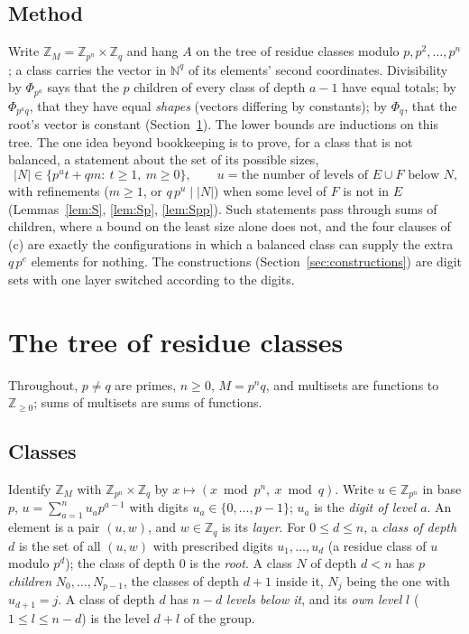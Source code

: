 \documentclass[11pt,a4paper]{amsart}
\theoremstyle{definition}
\theoremstyle{remark}
\newcommand{\Z}{\mathbb{Z}}
\newcommand{\N}{\mathbb{N}}
\begin{document}
\subsection{Method} Write $\Z_M=\Z_{p^n}\times\Z_q$ and hang $A$ on the tree of residue classes modulo
$p,p^2,\dots,p^n$; a class carries the vector in $\N^q$ of its elements' second coordinates. Divisibility by
$\Phi_{p^a}$ says that the $p$ children of every class of depth $a-1$ have equal totals; by $\Phi_{p^aq}$,
that they have equal \emph{shapes} (vectors differing by constants); by $\Phi_q$, that the root's vector is
constant (Section~\ref{sec:tree}). The lower bounds are inductions on this tree. The one idea beyond
bookkeeping is to prove, for a class that is not balanced, a statement about the set of its possible sizes,
\[ |N|\in\{p^ut+qm:\ t\ge 1,\ m\ge 0\},\qquad u=\text{the number of levels of $E\cup F$ below $N$,}\]
with refinements ($m\ge 1$, or $q\,p^u\mid |N|$) when some level of $F$ is not in $E$
(Lemmas~\ref{lem:S}, \ref{lem:Sp}, \ref{lem:Spp}). Such statements pass through sums of children, where a
bound on the least size alone does not, and the four clauses of (c) are exactly the configurations in which a
balanced class can supply the extra $q\,p^e$ elements for nothing. The constructions
(Section~\ref{sec:constructions}) are digit sets with one layer switched according to the digits.

\section{The tree of residue classes}\label{sec:tree}

Throughout, $p\ne q$ are primes, $n\ge 0$, $M=p^nq$, and multisets are functions to $\Z_{\ge 0}$; sums of
multisets are sums of functions.

\subsection*{Classes} Identify $\Z_M$ with $\Z_{p^n}\times\Z_q$ by $x\mapsto(x \bmod p^n,\ x\bmod q)$. Write
$u\in\Z_{p^n}$ in base $p$, $u=\sum_{a=1}^{n}u_a p^{a-1}$ with digits $u_a\in\{0,\dots,p-1\}$; $u_a$ is the
\emph{digit of level $a$}. An element is a pair $(u,w)$, and $w\in\Z_q$ is its \emph{layer}. For
$0\le d\le n$, a \emph{class of depth $d$} is the set of all $(u,w)$ with prescribed digits $u_1,\dots,u_d$
(a residue class of $u$ modulo $p^d$); the class of depth $0$ is the \emph{root}. A class $N$ of depth $d<n$
has $p$ \emph{children} $N_0,\dots,N_{p-1}$, the classes of depth $d+1$ inside it, $N_j$ being the one with
$u_{d+1}=j$. A class of depth $d$ has $n-d$ \emph{levels below it}, and its \emph{own level} $l$
($1\le l\le n-d$) is the level $d+l$ of the group.
\end{document}
